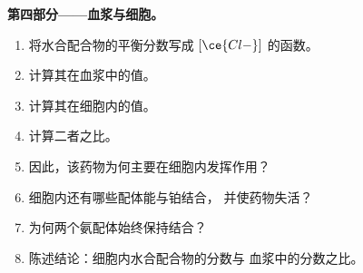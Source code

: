 \begin{problem}
\medskip\noindent\textbf{第四部分——血浆与细胞。}
\begin{enumerate}[resume]
  \item 将水合配合物的平衡分数写成
        $[\ce{Cl-}]$ 的函数。
  \item 计算其在血浆中的值。
  \item 计算其在细胞内的值。
  \item 计算二者之比。
  \item 因此，该药物为何主要在细胞内发挥作用？
  \item 细胞内还有哪些配体能与铂结合，
        并使药物失活？
  \item 为何两个氨配体始终保持结合？
  \item 陈述结论：细胞内水合配合物的分数与
        血浆中的分数之比。
\end{enumerate}
\end{problem}
